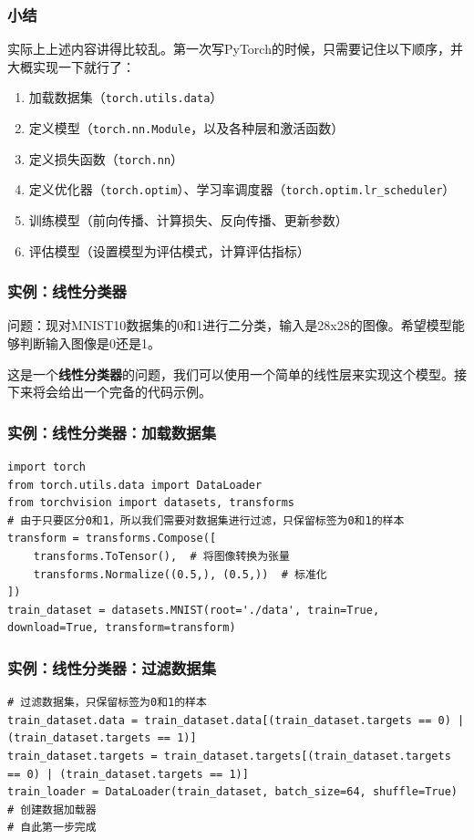 \begin{frame}[fragile]
    \frametitle{小结}
    实际上上述内容讲得比较乱。第一次写PyTorch的时候，只需要记住以下顺序，并大概实现一下就行了：

    \begin{enumerate}
        \item 加载数据集（\texttt{torch.utils.data}）
        \item 定义模型（\texttt{torch.nn.Module}，以及各种层和激活函数）
        \item 定义损失函数（\texttt{torch.nn}）
        \item 定义优化器（\texttt{torch.optim}）、学习率调度器（\texttt{torch.optim.lr_scheduler}）
        \item 训练模型（前向传播、计算损失、反向传播、更新参数）
        \item 评估模型（设置模型为评估模式，计算评估指标）
    \end{enumerate}

\end{frame}

\begin{frame}[fragile]
    \frametitle{实例：线性分类器}

    问题：现对MNIST10数据集的0和1进行二分类，输入是28x28的图像。希望模型能够判断输入图像是0还是1。

    这是一个\textbf{线性分类器}的问题，我们可以使用一个简单的线性层来实现这个模型。接下来将会给出一个完备的代码示例。

\end{frame}

\begin{frame}[fragile]
    \frametitle{实例：线性分类器：加载数据集}

    \begin{verbatim}
import torch
from torch.utils.data import DataLoader
from torchvision import datasets, transforms
# 由于只要区分0和1，所以我们需要对数据集进行过滤，只保留标签为0和1的样本
transform = transforms.Compose([
    transforms.ToTensor(),  # 将图像转换为张量
    transforms.Normalize((0.5,), (0.5,))  # 标准化
])
train_dataset = datasets.MNIST(root='./data', train=True, download=True, transform=transform)

    \end{verbatim}

\end{frame}

\begin{frame}[fragile]
    \frametitle{实例：线性分类器：过滤数据集}

    \begin{verbatim}
# 过滤数据集，只保留标签为0和1的样本
train_dataset.data = train_dataset.data[(train_dataset.targets == 0) | (train_dataset.targets == 1)]
train_dataset.targets = train_dataset.targets[(train_dataset.targets == 0) | (train_dataset.targets == 1)]
train_loader = DataLoader(train_dataset, batch_size=64, shuffle=True)  # 创建数据加载器
# 自此第一步完成        
    \end{verbatim}
\end{frame}

